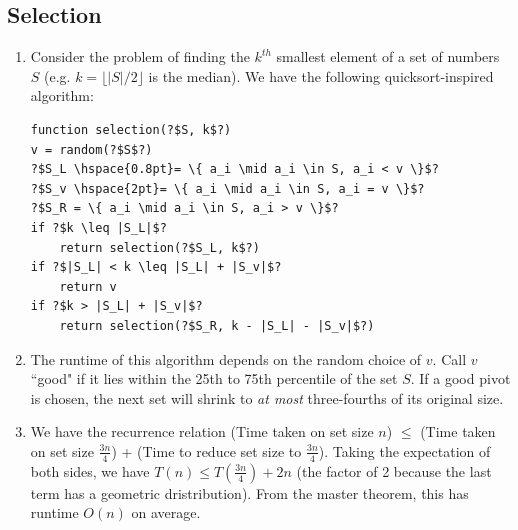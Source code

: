\documentclass[10pt]{article}
\begin{document}
\begin{multicols}{2}
\begin{addmargin}[0.8em]{0.5em}
    \subsection{Selection}
    \begin{enumerate}[label=(\alph*)]
        \item Consider the problem of finding the $k^{th}$ smallest element of a set of numbers $S$ (e.g. $k=\lfloor |S|/2 \rfloor$ is the median). We have the following quicksort-inspired algorithm:
        \begin{verbatim}
function selection(?$S, k$?)
v = random(?$S$?)
?$S_L \hspace{0.8pt}= \{ a_i \mid a_i \in S, a_i < v \}$?
?$S_v \hspace{2pt}= \{ a_i \mid a_i \in S, a_i = v \}$?
?$S_R = \{ a_i \mid a_i \in S, a_i > v \}$?
if ?$k \leq |S_L|$?
    return selection(?$S_L, k$?)
if ?$|S_L| < k \leq |S_L| + |S_v|$?
    return v
if ?$k > |S_L| + |S_v|$?
    return selection(?$S_R, k - |S_L| - |S_v|$?) 
        \end{verbatim}        
        
    \item The runtime of this algorithm depends on the random choice of $v$. Call $v$ ``good" if it lies within the 25th to 75th percentile of the set $S$. If a good pivot is chosen, the next set will shrink to \textit{at most} three-fourths of its original size. 
    \item We have the recurrence relation (Time taken on set size $n$) $\leq$ 
    (Time taken on set size $\frac{3n}{4}$) + 
    (Time to reduce set size to $\frac{3n}{4}$). Taking the expectation of both sides, we have $T(n) \leq T(\frac{3n}{4}) + 2n$ (the factor of 2 because the last term has a geometric dristribution). From the master theorem, this has runtime $O(n)$ on average.
    \end{enumerate}     
    

\end{addmargin}
\end{multicols}
\end{document}
